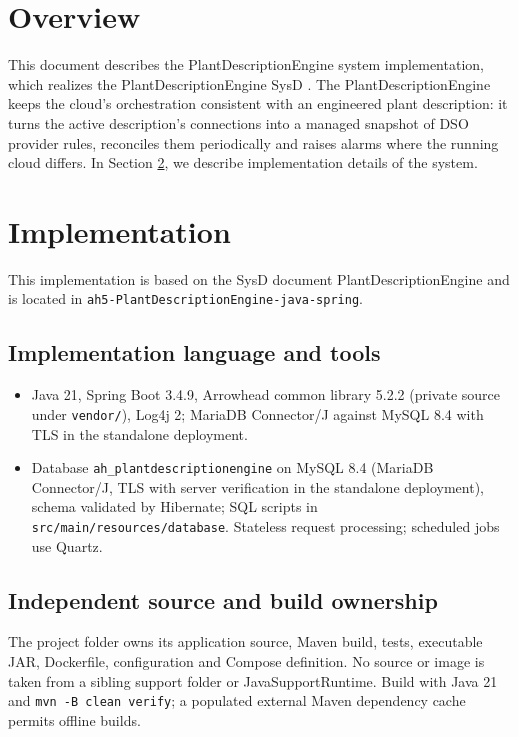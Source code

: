 \documentclass[a4paper]{arrowhead}
\begin{document}
\section{Overview}
\label{sec:overview}

This document describes the PlantDescriptionEngine system implementation, which realizes the PlantDescriptionEngine SysD \cite{pde-sysd}. The Plant\allowbreak{}Description\allowbreak{}Engine keeps the cloud's orchestration consistent with an engineered plant description: it turns the active description's connections into a managed snapshot of DSO provider rules, reconciles them periodically and raises alarms where the running cloud differs.
In Section \ref{Implementation}, we describe implementation details of the system.

\newpage

\section{Implementation}
\label{Implementation}

This implementation is based on the SysD document PlantDescriptionEngine \cite{pde-sysd} and is located in \texttt{ah5-PlantDescriptionEngine-java-spring}.

\subsection{Implementation language and tools}
\begin{itemize}
\item Java 21, Spring Boot 3.4.9, Arrowhead common library 5.2.2 (private source under \texttt{vendor/}), Log4j 2; MariaDB Connector/J against MySQL 8.4 with TLS in the standalone deployment.
\item Database \texttt{ah\_\allowbreak{}plantdescriptionengine} on MySQL 8.4 (MariaDB Connector/J, TLS with server verification in the standalone deployment), schema validated by Hibernate; SQL scripts in \texttt{src/\allowbreak{}main/\allowbreak{}resources/\allowbreak{}database}. Stateless request processing; scheduled jobs use Quartz.
\end{itemize}

\subsection{Independent source and build ownership}
The project folder owns its application source, Maven build, tests, executable JAR, Dockerfile, configuration and Compose definition. No source or image is taken from a sibling support folder or JavaSupportRuntime. Build with Java 21 and \texttt{mvn -B clean verify}; a populated external Maven dependency cache permits offline builds.
\end{document}
